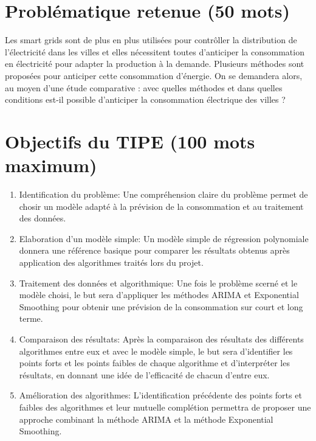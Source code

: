 \documentclass[12pt,a4paper]{article}
\begin{document}
\section*{Problématique retenue (50 mots)}
 Les smart grids sont de plus en plus utilisées pour contrôller la distribution de l'électricité dans les villes et elles nécessitent toutes d'anticiper la consommation en électricité pour adapter la production à la demande. Plusieurs méthodes sont proposées pour anticiper cette consommation d'énergie. On se demandera alors, au moyen d'une étude comparative : avec quelles méthodes et dans quelles conditions est-il possible d'anticiper la consommation électrique des villes ?
\section*{Objectifs du TIPE (100 mots maximum)}
\begin{enumerate}
    \item   Identification du problème: Une compréhension claire du problème permet de chosir un modèle adapté à la prévision de la consommation et au traitement des données.

    \item   Elaboration d'un modèle simple: Un modèle simple de régression polynomiale donnera une référence basique pour comparer les résultats obtenus après application des algorithmes traités lors du projet.
	
    \item   Traitement des données et algorithmique: Une fois le problème scerné et le modèle choisi, le but sera d'appliquer les méthodes ARIMA et Exponential Smoothing pour obtenir une prévision de la consommation sur court et long terme.
    
    \item	Comparaison des résultats: Après la comparaison des résultats des différents algorithmes entre eux et avec le modèle simple, le but sera d'identifier les points forts et les points faibles de chaque algorithme et d'interpréter les résultats, en donnant une idée de l'efficacité de chacun d'entre eux.
    
    \item   Amélioration des algorithmes: L'identification précédente des points forts et faibles des algorithmes et leur mutuelle complétion permettra de proposer une approche combinant la méthode ARIMA et la méthode Exponential Smoothing.
\end{enumerate}
\end{document}
